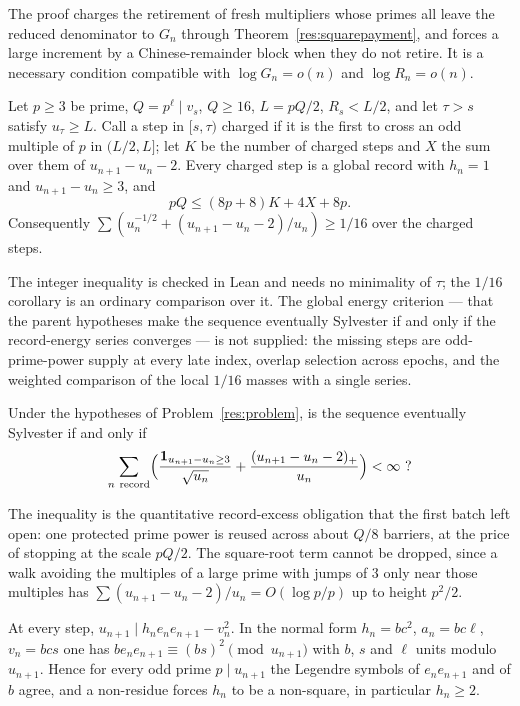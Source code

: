 \documentclass[11pt]{article}
\begin{document}
The proof charges the retirement of fresh multipliers whose primes all leave the
reduced denominator to $G_n$ through Theorem~\ref{res:squarepayment}, and forces
a large increment by a Chinese-remainder block when they do not retire.  It is a
necessary condition compatible with $\log G_n=o(n)$ and $\log R_n=o(n)$.

\begin{theorem}\label{res:epoch}
Let $p\ge3$ be prime, $Q=p^{\ell}\mid v_s$, $Q\ge16$, $L=pQ/2$, $R_s<L/2$, and
let $\tau>s$ satisfy $u_\tau\ge L$.  Call a step in $[s,\tau)$ charged if it is
the first to cross an odd multiple of $p$ in $(L/2,L]$; let $K$ be the number of
charged steps and $X$ the sum over them of $u_{n+1}-u_n-2$.  Every charged step
is a global record with $h_n=1$ and $u_{n+1}-u_n\ge3$, and
\[
 pQ\le(8p+8)K+4X+8p .
\]
Consequently $\sum(u_n^{-1/2}+(u_{n+1}-u_n-2)/u_n)\ge1/16$ over the charged
steps.
\end{theorem}

The integer inequality is checked in Lean and needs no minimality of $\tau$;
the $1/16$ corollary is an ordinary comparison over it.  The global energy
criterion --- that the parent hypotheses make the sequence eventually
Sylvester if and only if the record-energy series converges --- is not
supplied: the missing steps are odd-prime-power supply at every late index,
overlap selection across epochs, and the weighted comparison of the local
$1/16$ masses with a single series.

\begin{problem}\label{res:epochglobal}
Under the hypotheses of Problem~\ref{res:problem}, is the sequence eventually
Sylvester if and only if
\[
 \sum_{n\ \text{record}}\Bigl(\frac{\mathbf 1_{u_{n+1}-u_n\ge3}}{\sqrt{u_n}}
 +\frac{(u_{n+1}-u_n-2)_+}{u_n}\Bigr)<\infty\ ?
\]
\end{problem}

The inequality is the quantitative record-excess obligation that the first
batch left open: one protected prime power is reused across about $Q/8$
barriers, at the price of stopping at the scale $pQ/2$.  The square-root term
cannot be dropped, since a walk avoiding the multiples of a large prime with
jumps of $3$ only near those multiples has $\sum(u_{n+1}-u_n-2)/u_n=O(\log p/p)$
up to height $p^2/2$.

\begin{theorem}\label{res:saturated}
At every step, $u_{n+1}\mid h_ne_ne_{n+1}-v_n^2$.  In the normal form
$h_n=bc^2$, $a_n=bc\ell$, $v_n=bcs$ one has
$be_ne_{n+1}\equiv(bs)^2\pmod{u_{n+1}}$ with $b$, $s$ and $\ell$ units modulo
$u_{n+1}$.  Hence for every odd prime $p\mid u_{n+1}$ the Legendre symbols of
$e_ne_{n+1}$ and of $b$ agree, and a non-residue forces $h_n$ to be a
non-square, in particular $h_n\ge2$.
\end{theorem}
\end{document}
